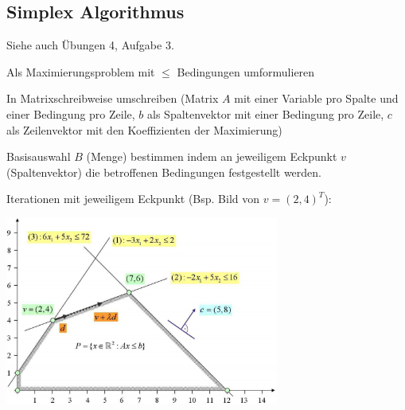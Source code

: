 \subsection{Simplex Algorithmus }
  Siehe auch Übungen 4, Aufgabe 3.
  
  \begin{aufzaehlung}
    \item Als Maximierungsproblem mit $\leq$ Bedingungen umformulieren
    \item In Matrixschreibweise umschreiben (Matrix $A$ mit einer Variable pro Spalte und einer 
      Bedingung pro Zeile, $b$ als Spaltenvektor mit einer Bedingung pro Zeile, $c$ als 
      Zeilenvektor mit den Koeffizienten der Maximierung)
    \item Basisauswahl $B$ (Menge) bestimmen indem an jeweiligem Eckpunkt $v$ (Spaltenvektor) die betroffenen Bedingungen
          festgestellt werden.
    \item Iterationen mit jeweiligem Eckpunkt (Bsp. Bild von $v=(2,4)^T$):
        
        \begin{center}
        \includegraphics[width=9cm]{./Content/LinProg/simplex}
        \end{center}
  

\end{aufzaehlung}
